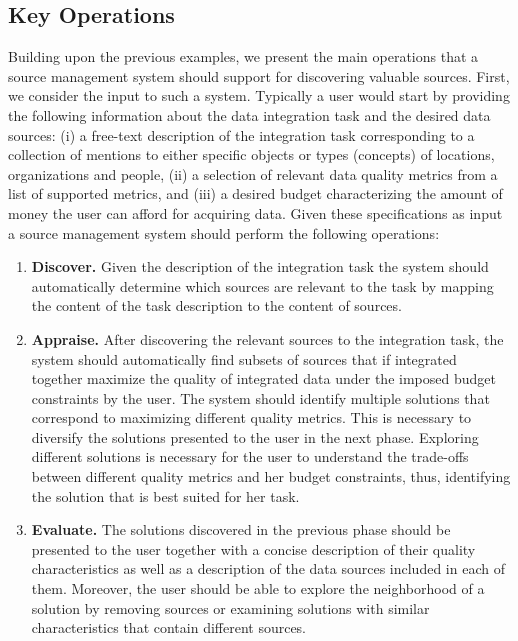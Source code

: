 \documentclass{sig-alternate}
\begin{document}
\subsection{Key Operations}
\label{sec:operations}
Building upon the previous examples, we present the main operations that a source management system should support for discovering valuable sources.  First, we consider the input to such a system. Typically a user would start by providing the following information about the data integration task and the desired data sources: (i) a free-text description of the integration task corresponding to a collection of mentions to either specific objects or types (concepts) of locations, organizations and people, (ii) a selection of relevant data quality metrics from a list of supported metrics, and (iii) a desired budget characterizing the amount of money the user can afford for acquiring data. Given these specifications as input  a source management system should perform the following operations:
\begin{enumerate}
\item {\bf Discover.} Given the description of the integration task the system should automatically determine which sources are relevant to the task by mapping the content of the task description to the content of sources.
\item {\bf Appraise.} After discovering the relevant sources to the integration task, the system should automatically find subsets of sources that if integrated together maximize the quality of integrated data under the imposed budget constraints by the user. The system should identify multiple solutions that correspond to maximizing different quality metrics. This is necessary to diversify the solutions presented to the user in the next phase. Exploring different solutions is necessary for the user to understand the trade-offs between different quality metrics and her budget constraints, thus, identifying the solution that is best suited for her task.
\item {\bf Evaluate.} The solutions discovered in the previous phase should be presented to the user together with a concise description of their quality characteristics as well as a description of the data sources included in each of them. Moreover, the user should be able to explore the neighborhood of a solution by removing sources or examining solutions with similar characteristics that contain different sources.
\end{enumerate}

\end{document}
